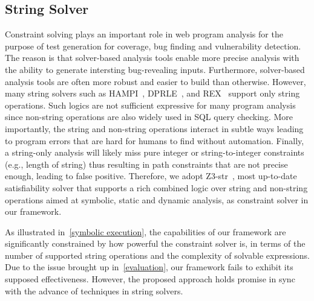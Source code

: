 \documentclass[conference]{IEEEtran}
\begin{document}
\subsection{String Solver}
Constraint solving plays an important role in web program analysis for the purpose of test generation for coverage, bug finding and vulnerability detection. The reason is that solver-based analysis tools enable more precise analysis with the ability to generate intersting bug-revealing inputs. Furthermore, solver-based analysis tools are often more robust and easier to build than otherwise. However, many string solvers such as HAMPI~\cite{hampi}, DPRLE~\cite{dprle}, and REX~\cite{rex} support only string operations. Such logics are not sufficient expressive for many program analysis since non-string operations are also widely used in SQL query checking. More importantly, the string and non-string operations interact in subtle ways leading to program errors that are hard for humans to find without automation. Finally, a string-only analysis will likely miss pure integer or string-to-integer constraints (e.g., length of string) thus resulting in path constraints that are not precise enough, leading to false positive. Therefore, we adopt Z3-str~\cite{z3-str}, most up-to-date satisfiability solver that supports a rich combined logic over string and non-string operations aimed at symbolic, static and dynamic analysis, as constraint solver in our framework.

As illustrated in~\ref{symbolic execution}, the capabilities of our framework are significantly constrained by how powerful the constraint solver is, in terms of the number of supported string operations and the complexity of solvable expressions. Due to the issue brought up in~\ref{evaluation}, our framework fails to exhibit its supposed effectiveness. However, the proposed approach holds promise in sync with the advance of techniques in string solvers.
\end{document}
